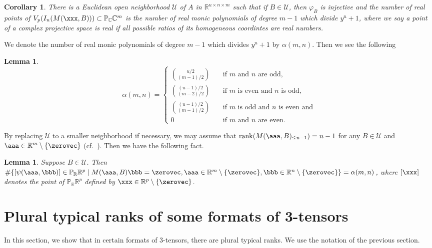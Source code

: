 \documentclass[a4paper,12pt]{article}
\newcommand{\CCC}{\mathbb{C}}
\newcommand{\PPP}{\mathbb{P}}
\newcommand{\RRR}{\mathbb{R}}
\newcommand{\msUUU}{\mathscr{U}}
\newcommand{\rank}{\mathrm{rank}}
\newtheorem{lemma}[thm]{Lemma}
\newtheorem{cor}[thm]{Corollary}
\begin{document}
\begin{cor}
There is a Euclidean open neighborhood $\msUUU$ of $A$ in $\RRR^{u\times n\times m}$
such that if $B\in\msUUU$, then $\varphi_B$ is injective and the number of real
points of $V_p(I_n(M(\xxx,B)))\subset\PPP_\CCC\CCC^m$ is the number of real monic
polynomials of degree $m-1$ which divide $y^u+1$,
where we say a point of a complex projective space is real if all possible ratios
of its homogeneous coordintes
are real numbers.
\end{cor}
%
%
We denote the number of real monic polynomials of degree $m-1$ which divides 
$y^u+1$ by $\alpha(m,n)$.
Then we see the following

\begin{lemma}
\label{lem:alpha m n}
$$
\alpha(m,n)=
\left\{
\begin{array}{ll}
{u/2\choose (m-1)/2}&\quad\mbox{if $m$ and $n$ are odd,}\\
{(u-1)/2\choose (m-2)/2}&\quad\mbox{if $m$ is even and $n$ is odd,}\\
{(u-1)/2\choose (m-1)/2}&\quad\mbox{if $m$ is odd and $n$ is even and}\\
0&\quad\mbox{if $m$ and $n$ are even.}
\end{array}
\right.
$$
\end{lemma}

By replacing $\msUUU$ to a smaller neighborhood if necessary,
we may assume that $\rank (M(\aaa,B)_{\leq n-1})=n-1$
for any $B\in\msUUU$ and $\aaa\in\RRR^m\setminus\{\zerovec\}$
(cf.\ \cite[Corollary 4.20]{sms17}).
Then we have the following fact.

\begin{lemma}
\label{lem:number gen}
Suppose $B\in\msUUU$.
Then
$\#\{[\psi(\aaa,\bbb)]\in\PPP_\RRR\RRR^p\mid
M(\aaa,B)\bbb=\zerovec,
\aaa\in\RRR^m\setminus\{\zerovec\},
\bbb\in\RRR^n\setminus\{\zerovec\}\}
=\alpha(m,n)$,
where $[\xxx]$ denotes the point of $\PPP_\RRR\RRR^p$ defined by
$\xxx\in\RRR^p\setminus\{\zerovec\}$.
\end{lemma}




\section{Plural typical ranks of some formats of 3-tensors}


In this section, we show that in  certain formats of 3-tensors,
there are plural typical ranks.
We use the notation of the previous section.
\end{document}
